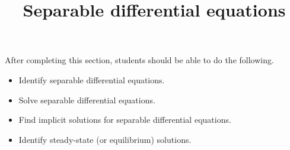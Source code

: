 \documentclass{ximera}
\title{Separable differential equations}
\begin{document}
\begin{abstract}
\end{abstract}

\maketitle

\begin{sectionOutcomes}

After completing this section, students should be able to do the following.

\begin{itemize}
\item Identify separable differential equations.
\item Solve separable differential equations.
\item Find implicit solutions for separable differential equations.
\item Identify steady-state (or equilibrium) solutions.
\end{itemize}

\end{sectionOutcomes}
\end{document}
